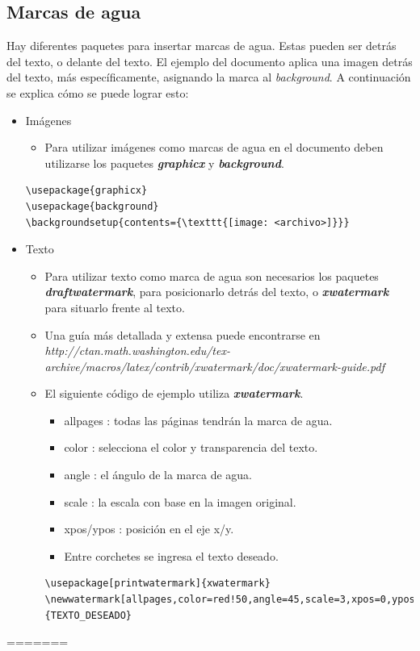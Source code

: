 \documentclass[10pt,journal,compsoc]{IEEEtran}
\begin{document}
	\subsection{Marcas de agua}
	Hay diferentes paquetes para insertar marcas de agua. Estas pueden ser detr\'as del texto, o delante del texto. El ejemplo del documento aplica una imagen detr\'as del texto, m\'as espec\'ificamente, asignando la marca al \emph{background}. A continuaci\'on se explica c\'omo se puede lograr esto:
	\begin{itemize}
		\item Im\'agenes
		\begin{itemize}
			\item Para utilizar im\'agenes como marcas de agua en el documento deben utilizarse los paquetes \textbf{\textit{graphicx}} y \textbf{\textit{background}}.	
		\end{itemize}
	\begin{lstlisting}
\usepackage{graphicx}
\usepackage{background}
\backgroundsetup{contents={\texttt{[image: <archivo>]}}}
	\end{lstlisting}
	\item Texto
		\begin{itemize}
			\item Para utilizar texto como marca de agua son necesarios los paquetes \textbf{\textit{draftwatermark}}, para posicionarlo detr\'as del texto, o \textbf{\textit{xwatermark}} para situarlo frente al texto.
			\item Una gu\'ia m\'as detallada y extensa puede encontrarse en \emph{http://ctan.math.washington.edu/tex-archive/macros/latex/contrib/xwatermark/doc/xwatermark-guide.pdf}
			\item El siguiente c\'odigo de ejemplo utiliza \textbf{\textit{xwatermark}}.
			\begin{itemize}
				\item allpages : todas las p\'aginas tendr\'an la marca de agua.
				\item color : selecciona el color y transparencia del texto.
				\item angle : el \'angulo de la marca de agua.
				\item scale : la escala con base en la imagen original.
				\item xpos/ypos : posici\'on en el eje x/y.
				\item Entre corchetes se ingresa el texto deseado.
			\end{itemize}	
			\begin{lstlisting}
\usepackage[printwatermark]{xwatermark}
\newwatermark[allpages,color=red!50,angle=45,scale=3,xpos=0,ypos=0]{TEXTO_DESEADO}
			\end{lstlisting}
		\end{itemize}
	\end{itemize}
=======
\end{document}
